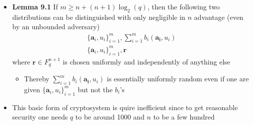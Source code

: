 \begin{itemize}
  \item \textbf{Lemma 9.1} If $m \geq n + (n+1) \log_2(q)$, then the following two distributions can be distinguished with only negligible in $n$ advantage (even by an unbounded adversary)
  \begin{align*}
    \{\mathbf{a}_i, u_i\}_{i=1}^m, \sum_{i=1}^m b_i(\mathbf{a_i},u_i) \\
    \{\mathbf{a}_i, u_i\}_{i=1}^m, \mathbf{r}
  \end{align*}
  where $\mathbf{r} \in F_q^{n+1}$ is chosen uniformly and independently of anything else
  \begin{itemize}
  	\item Thereby $\sum_{i=1}^m b_i(\mathbf{a_i},u_i)$ is essentially uniformly random even if one are given $\{\mathbf{a}_i, u_i\}_{i=1}^m$ but not the $b_i$'s
  \end{itemize}
  \item This basic form of cryptosystem is quire inefficient since to get reasonable security one needs $q$ to be around 1000 and $n$ to be a few hundred
\end{itemize}

\newpage


